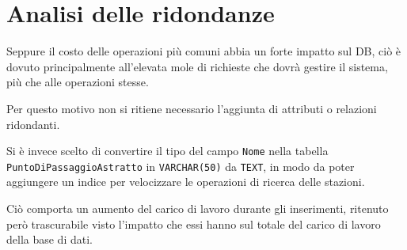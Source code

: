 \documentclass[a4paper,12pt]{report}
\begin{document}
	\section{Analisi delle ridondanze}
	\par Seppure il costo delle operazioni più comuni abbia un forte impatto sul DB, ciò è dovuto principalmente all'elevata mole di richieste che dovrà gestire il sistema, più che alle operazioni stesse.
	\par Per questo motivo non si ritiene necessario l'aggiunta di attributi o relazioni ridondanti.
	\par Si è invece scelto di convertire il tipo del campo \texttt{Nome} nella tabella \\ \texttt{PuntoDiPassaggioAstratto} in \texttt{VARCHAR(50)} da \texttt{TEXT}, in modo da poter aggiungere un indice per velocizzare le operazioni di ricerca delle stazioni.
	\par Ciò comporta un aumento del carico di lavoro durante gli inserimenti, ritenuto però trascurabile visto l'impatto che essi hanno sul totale del carico di lavoro della base di dati.
\end{document}
